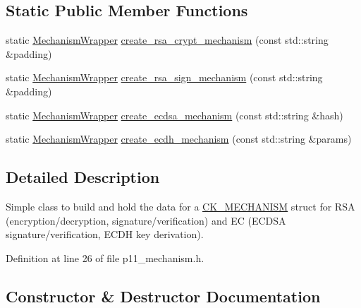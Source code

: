 \subsection*{Static Public Member Functions}
\begin{DoxyCompactItemize}
\item 
static \mbox{\hyperlink{class_botan_1_1_p_k_c_s11_1_1_mechanism_wrapper}{Mechanism\+Wrapper}} \mbox{\hyperlink{class_botan_1_1_p_k_c_s11_1_1_mechanism_wrapper_ab932289112cf71c2b2ace67fae1964e6}{create\+\_\+rsa\+\_\+crypt\+\_\+mechanism}} (const std\+::string \&padding)
\item 
static \mbox{\hyperlink{class_botan_1_1_p_k_c_s11_1_1_mechanism_wrapper}{Mechanism\+Wrapper}} \mbox{\hyperlink{class_botan_1_1_p_k_c_s11_1_1_mechanism_wrapper_a1cbf913279dc581d4822910f3a86c287}{create\+\_\+rsa\+\_\+sign\+\_\+mechanism}} (const std\+::string \&padding)
\item 
static \mbox{\hyperlink{class_botan_1_1_p_k_c_s11_1_1_mechanism_wrapper}{Mechanism\+Wrapper}} \mbox{\hyperlink{class_botan_1_1_p_k_c_s11_1_1_mechanism_wrapper_ab5cb786b286844ffb2ea2af2a232459d}{create\+\_\+ecdsa\+\_\+mechanism}} (const std\+::string \&hash)
\item 
static \mbox{\hyperlink{class_botan_1_1_p_k_c_s11_1_1_mechanism_wrapper}{Mechanism\+Wrapper}} \mbox{\hyperlink{class_botan_1_1_p_k_c_s11_1_1_mechanism_wrapper_a1b5254b80bd47178af6ed563df0a9352}{create\+\_\+ecdh\+\_\+mechanism}} (const std\+::string \&params)
\end{DoxyCompactItemize}


\subsection{Detailed Description}
Simple class to build and hold the data for a \mbox{\hyperlink{struct_c_k___m_e_c_h_a_n_i_s_m}{C\+K\+\_\+\+M\+E\+C\+H\+A\+N\+I\+SM}} struct for R\+SA (encryption/decryption, signature/verification) and EC (E\+C\+D\+SA signature/verification, E\+C\+DH key derivation). 

Definition at line 26 of file p11\+\_\+mechanism.\+h.



\subsection{Constructor \& Destructor Documentation}
\mbox{\label{class_botan_1_1_p_k_c_s11_1_1_mechanism_wrapper_ad330d79c0f7c0f57f08be67d6944b504}} 
